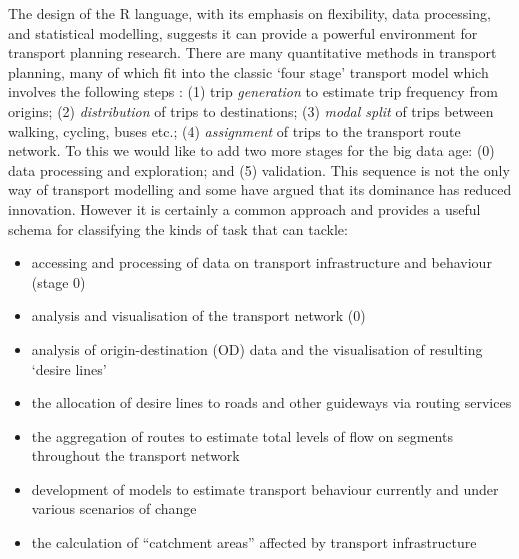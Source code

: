 The design of the R language, with its emphasis on flexibility, data
processing, and statistical modelling, suggests it can provide a powerful
environment for transport planning research. There are many quantitative
methods in transport planning, many of which fit into the
classic `four stage' transport model which involves the following steps
\citep{willumsen_modelling_2011}:
(1) trip \emph{generation} to estimate trip frequency from origins;
(2) \emph{distribution} of trips to destinations;
(3) \emph{modal split} of trips between walking, cycling, buses etc.;
(4) \emph{assignment} of trips to the transport route network.
To this we would like to add two more stages for the big data age:
(0) data processing and exploration; and
(5) validation.
This sequence is not the only way of transport modelling
and some have argued that its dominance has reduced innovation.
However it is certainly a common approach and provides a useful
schema for classifying the kinds of task that  can tackle:

\begin{itemize}
\tightlist
\item
  accessing and processing of data on transport infrastructure and
  behaviour (stage 0)
\item
  analysis and visualisation of the transport network (0)
\item
  analysis of origin-destination (OD) data and the visualisation of
  resulting `desire lines'
\item
  the allocation of desire lines to roads and other guideways via
  routing services
\item
  the aggregation of routes to estimate total levels of flow on segments
  throughout the transport network
\item
  development of models to estimate transport behaviour currently and
  under various scenarios of change
\item
  the calculation of ``catchment areas'' affected by transport
  infrastructure
\end{itemize}


